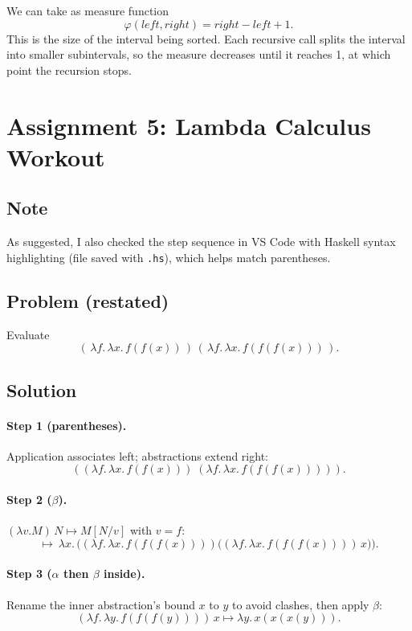 \documentclass[11pt]{article}
\begin{document}
We can take as measure function
\[
  \varphi(left,right) = right-left+1.
\]
This is the size of the interval being sorted.
Each recursive call splits the interval into smaller subintervals,
so the measure decreases until it reaches 1, at which point the recursion stops.

\section{Assignment 5: Lambda Calculus Workout}

\subsection*{Note}
As suggested, I also checked the step sequence in VS Code with Haskell
syntax highlighting (file saved with \texttt{.hs}), which helps match parentheses.

\subsection*{Problem (restated)}
Evaluate
\[
  (\,\lambda f.\,\lambda x.\,f(f(x))\,)\,(\,\lambda f.\,\lambda x.\,f(f(f(x)))\,).
\]

\subsection*{Solution}
\paragraph{Step 1 (parentheses).}
Application associates left; abstractions extend right:
\[
  ((\lambda f.\,\lambda x.\,f(f(x)))\;(\lambda f.\,\lambda x.\,f(f(f(x))))).
\]

\paragraph{Step 2 ($\beta$).}
$(\lambda v.M)\,N \mapsto M[N/v]$ with $v=f$:
\[
  \mapsto\ \lambda x.\, \big((\lambda f.\,\lambda x.\,f(f(f(x))))\big((\lambda f.\,\lambda x.\,f(f(f(x))))\,x\big)\big).
\]

\paragraph{Step 3 ($\alpha$ then $\beta$ inside).}
Rename the inner abstraction’s bound $x$ to $y$ to avoid clashes,
then apply $\beta$:
\[
 (\lambda f.\,\lambda y.\,f(f(f(y))))\,x \mapsto \lambda y.\,x(x(x(y))).
\]
\end{document}
